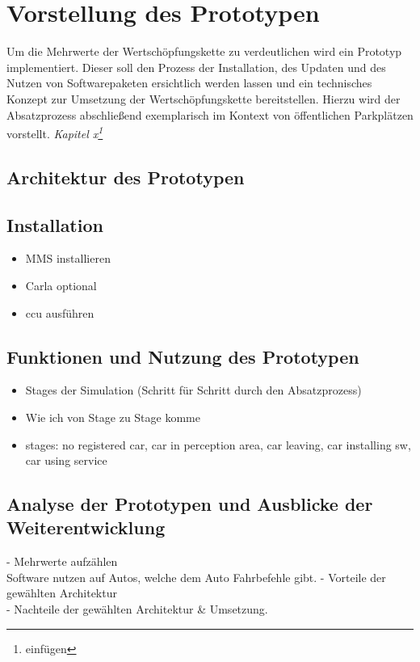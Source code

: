 \section{Vorstellung des Prototypen}\label{prototyp}
Um die Mehrwerte der Wertschöpfungskette zu verdeutlichen wird ein Prototyp implementiert. Dieser soll den Prozess der Installation, des Updaten und des Nutzen von Softwarepaketen ersichtlich werden lassen und ein technisches Konzept zur Umsetzung der Wertschöpfungskette bereitstellen. Hierzu wird der Absatzprozess abschließend exemplarisch im Kontext von öffentlichen Parkplätzen vorstellt. \textit{Kapitel x\footnote{einfügen}}
\subsection{Architektur des Prototypen}

\subsection{Installation}
\begin{itemize}
	\item MMS installieren
	\item Carla optional
	\item ccu ausführen
\end{itemize}
\subsection{Funktionen und Nutzung des Prototypen}
\begin{itemize}
	\item Stages der Simulation (Schritt für Schritt durch den Absatzprozess)
	\item Wie ich von Stage zu Stage komme
	\item stages: no registered car, car in perception area, car leaving, car installing sw, car using service
\end{itemize}
\subsection{Analyse der Prototypen und Ausblicke der Weiterentwicklung}
- Mehrwerte aufzählen\\
   Software nutzen auf Autos, welche dem Auto Fahrbefehle gibt.
- Vorteile der gewählten Architektur\\
- Nachteile der gewählten Architektur \& Umsetzung.
